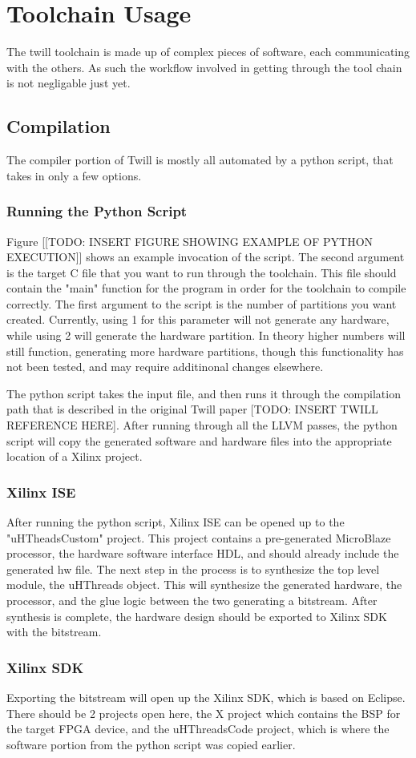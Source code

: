\chapter{Toolchain Usage}
The twill toolchain is made up of complex pieces of software, each communicating with the others. As such the workflow involved in getting through the tool chain is not negligable just yet.

\section{Compilation}
The compiler portion of Twill is mostly all automated by a python script, that takes in only a few options. 

\subsection{Running the Python Script}
Figure [[TODO: INSERT FIGURE SHOWING EXAMPLE OF PYTHON EXECUTION]] shows an example invocation of the script. The second argument is the target C file that you want to run through the toolchain. This file should contain the "main" function for the program in order for the toolchain to compile correctly. The first argument to the script is the number of partitions you want created. Currently, using 1 for this parameter will not generate any hardware, while using 2 will generate the hardware partition. In theory higher numbers will still function, generating more hardware partitions, though this functionality has not been tested, and may require additinonal changes elsewhere.

The python script takes the input file, and then runs it through the compilation path that is described in the original Twill paper [TODO: INSERT TWILL REFERENCE HERE]. After running through all the LLVM passes, the python script will copy the generated software and hardware files into the appropriate location of a Xilinx project. 

\subsection{Xilinx ISE}
After running the python script, Xilinx ISE can be opened up to the "uHTheadsCustom" project. This project contains a pre-generated MicroBlaze processor, the hardware software interface HDL, and should already include the generated hw file. The next step in the process is to synthesize the top level module, the uHThreads object. This will synthesize the generated hardware, the processor, and the glue logic between the two generating a bitstream. After synthesis is complete, the hardware design should be exported to Xilinx SDK with the bitstream.

\subsection{Xilinx SDK}
Exporting the bitstream will open up the Xilinx SDK, which is based on Eclipse. There should be 2 projects open here, the X project which contains the BSP for the target FPGA device, and the uHThreadsCode project, which is where the software portion from the python script was copied earlier. 